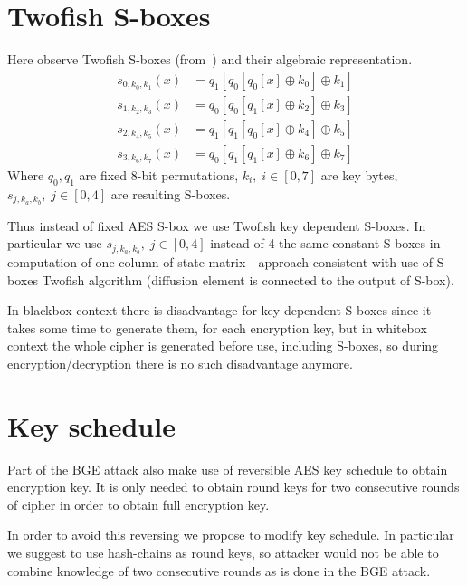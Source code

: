 \documentclass[11pt,oneside,final]{fithesis2}
\begin{document}
    \section{Twofish S-boxes}\label{sec:twofish_sbox}
    Here observe Twofish S-boxes (from~\citep{Schneier98twofish:a}) and their algebraic representation.
    \begin{subequations}\label{eq:twofish_sbox}
    \begin{align}
	s_{0,k_0,k_1}\left(x\right) &= q_1\left[q_0\left[q_0\left[x\right] \oplus k_0 \right] \oplus k_1 \right]\\
	s_{1,k_2,k_3}\left(x\right) &= q_0\left[q_0\left[q_1\left[x\right] \oplus k_2 \right] \oplus k_3 \right]\\
	s_{2,k_4,k_5}\left(x\right) &= q_1\left[q_1\left[q_0\left[x\right] \oplus k_4 \right] \oplus k_5 \right]\\
	s_{3,k_6,k_7}\left(x\right) &= q_0\left[q_1\left[q_1\left[x\right] \oplus k_6 \right] \oplus k_7 \right]
    \end{align}
    \end{subequations}
    Where $q_0, q_1$ are fixed 8-bit permutations, $k_i,\; i \in [0,7]$ are key bytes, $s_{j,k_a,k_b},\; j \in [0,4]$ are resulting S-boxes.

    Thus instead of fixed AES S-box we use Twofish key dependent S-boxes. In particular we use $s_{j,k_a,k_b},\; j \in [0,4]$ instead of 4 the same constant
    S-boxes in computation of one column of state matrix - approach consistent with use of S-boxes Twofish algorithm (diffusion element is connected 
    to the output of S-box). 

    In blackbox context there is disadvantage for key dependent S-boxes since it takes some time to generate them, for each encryption key, but in whitebox context
    the whole cipher is generated before use, including S-boxes, so during encryption/decryption there is no such disadvantage anymore.
   
    \section{Key schedule}
    Part of the BGE attack also make use of reversible AES key schedule to obtain encryption key. It is only needed to obtain round keys for two consecutive
    rounds of cipher in order to obtain full encryption key.

    In order to avoid this reversing we propose to modify key schedule.
    In particular we suggest to use hash-chains as round keys, so attacker would not be able to combine knowledge of two consecutive rounds as is done in the BGE attack.
    
\end{document}
